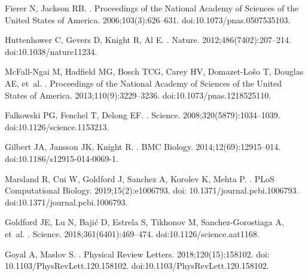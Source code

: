 \documentclass[10pt,letterpaper]{article}
\begin{document}
\begin{thebibliography}{10}

Fierer N, Jackson RB.
.
\newblock Proceedings of the National Academy of Sciences of the United States
  of America. 2006;103(3):626--631.
\newblock doi:{10.1073/pnas.0507535103}.

Huttenhower C, Gevers D, Knight R, Al E.
.
\newblock Nature. 2012;486(7402):207–214.
\newblock doi:{10.1038/nature11234}.

McFall-Ngai M, Hadfield MG, Bosch TCG, Carey HV, Domazet-Lo{\v{s}}o T, Douglas
  AE, et~al.
.
\newblock Proceedings of the National Academy of Sciences of the United States of America. 2013;110(9):3229--3236.
\newblock doi:{10.1073/pnas.1218525110}.

Falkowski PG, Fenchel T, Delong EF.
.
\newblock Science. 2008;320(5879):1034--1039.
\newblock doi:{10.1126/science.1153213}.

Gilbert JA, Jansson JK, Knight R.
.
\newblock BMC Biology. 2014;12(69):12915--014.
\newblock doi:{10.1186/s12915-014-0069-1}.

Marsland R, Cui W, Goldford J, Sanchez A, Korolev K, Mehta P.
.
\newblock PLoS Computational Biology. 2019;15(2):e1006793. doi:
  10.1371/journal.pcbi.1006793.
\newblock doi:{10.1371/journal.pcbi.1006793}.

Goldford JE, Lu N, Baji{\'{c}} D, Estrela S, Tikhonov M, Sanchez-Gorostiaga A,
  et~al.
.
\newblock Science. 2018;361(6401):469--474.
\newblock doi:{10.1126/science.aat1168}.

Goyal A, Maslov S.
.
\newblock Physical Review Letters. 2018;120(15):158102. doi:
  10.1103/PhysRevLett.120.158102.
\newblock doi:{10.1103/PhysRevLett.120.158102}.


\end{thebibliography}
\end{document}
